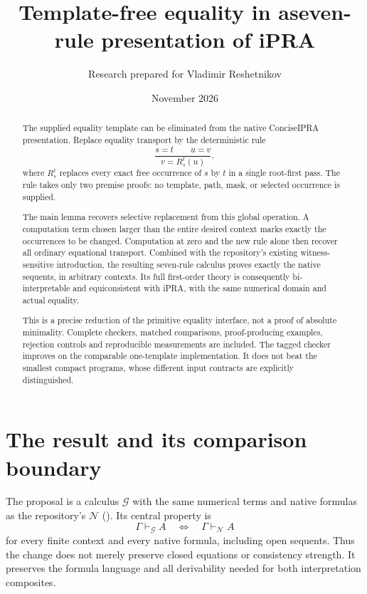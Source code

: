 \documentclass[11pt,letterpaper]{article}
\title{\color{ink}\bfseries Template-free equality in a\newline seven-rule presentation of iPRA}
\author{Research prepared for Vladimir Reshetnikov}
\date{November 2026}
\theoremstyle{definition}
\theoremstyle{remark}
\newcommand{\Ncal}{\mathcal N}
\newcommand{\Gcal}{\mathcal G}
\newcommand{\code}[1]{\texttt{\detokenize{#1}}}
\begin{document}
\maketitle
\begin{abstract}
The supplied equality template can be eliminated from the native
ConciseIPRA presentation. Replace equality transport by the deterministic
rule
\[
 \frac{s=t\qquad u=v}{v=R_s^t(u)},
\]
where $R_s^t$ replaces every exact free occurrence of $s$ by $t$ in a
single root-first pass. The rule takes only two premise proofs: no
template, path, mask, or selected occurrence is supplied.

The main lemma recovers selective replacement from this global operation.
A computation term chosen larger than the entire desired context marks
exactly the occurrences to be changed. Computation at zero and the new
rule alone then recover all ordinary equational transport. Combined with
the repository's existing witness-sensitive introduction, the resulting
seven-rule calculus proves exactly the native sequents, in arbitrary
contexts. Its full first-order theory is consequently bi-interpretable
and equiconsistent with iPRA, with the same numerical domain and actual
equality.

This is a precise reduction of the primitive equality interface, not a
proof of absolute minimality. Complete checkers, matched comparisons,
proof-producing examples, rejection controls and reproducible measurements
are included. The tagged checker improves on the comparable one-template
implementation. It does not beat the smallest compact programs, whose
different input contracts are explicitly distinguished.
\end{abstract}

\clearpage
\tableofcontents
\clearpage

\section{The result and its comparison boundary}
\label{new:status}

The proposal is a calculus $\Gcal$ with the same numerical terms and
native formulas as the repository's $\Ncal$ (\code{NPrf}). Its central
property is
\[
             \Gamma\vdash_{\Gcal}A
             \quad\Longleftrightarrow\quad
             \Gamma\vdash_{\Ncal}A
             \tag{1}\label{new:exact}
\]
for every finite context and every native formula, including open
sequents. Thus the change does not merely preserve closed equations or
consistency strength. It preserves the formula language and all
derivability needed for both interpretation composites.
\end{document}
